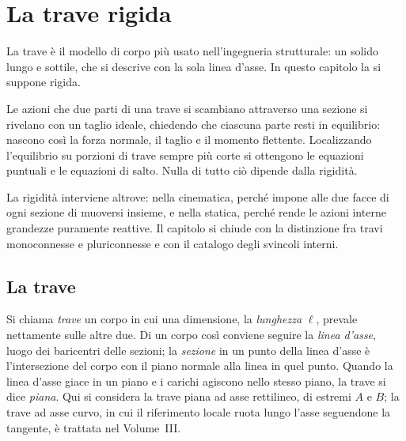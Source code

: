 \graphicspath{{Parti/P04-Travi_rigide/P04-Travi_rigide/Figure/}}
\chapter{La trave rigida}\label{cap:Trave_Rigida}

\begin{sommario}
	La trave è il modello di corpo più usato nell'ingegneria
	strutturale: un solido lungo e sottile, che si descrive
	con la sola linea d'asse. In questo capitolo la si
	suppone rigida.
	
	Le azioni che due parti di una trave si scambiano
	attraverso una sezione si rivelano con un taglio ideale,
	chiedendo che ciascuna parte resti in equilibrio: nascono
	così la forza normale, il taglio e il momento flettente.
	Localizzando l'equilibrio su porzioni di trave sempre più
	corte si ottengono le equazioni puntuali e le equazioni
	di salto. Nulla di tutto ciò dipende dalla rigidità.
	
	La rigidità interviene altrove: nella cinematica, perché
	impone alle due facce di ogni sezione di muoversi insieme,
	e nella statica, perché rende le azioni interne grandezze
	puramente reattive. Il capitolo si chiude con la
	distinzione fra travi monoconnesse e pluriconnesse e con
	il catalogo degli svincoli interni.
\end{sommario}



\section{La trave}
\label{sec:trave_def}

Si chiama \emph{trave} un corpo in
cui una dimensione, la \emph{lunghezza} $\ell$, prevale
nettamente sulle altre due. Di un corpo così conviene
seguire la \emph{linea d'asse},
luogo dei baricentri delle sezioni; la
\emph{sezione} in un
punto della linea d'asse è l'intersezione del corpo con
il piano normale alla linea in quel punto. Quando la
linea d'asse giace in un piano e i carichi agiscono
nello stesso piano, la trave si dice
\emph{piana}. Qui si considera
la trave piana ad asse rettilineo, di estremi $A$ e $B$;
la trave ad asse curvo, in cui il riferimento locale
ruota lungo l'asse seguendone la tangente, è trattata
nel Volume~III.

